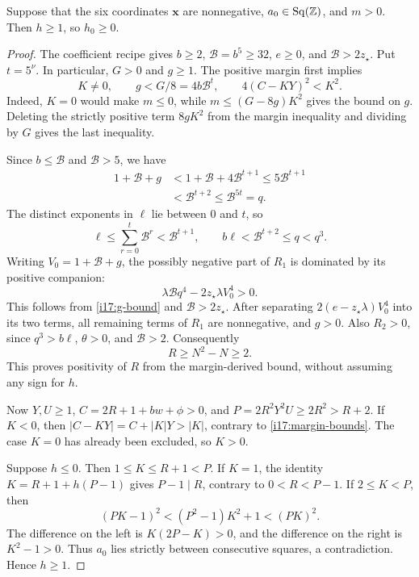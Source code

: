 \begin{lemma}
\label{i17:h-guard}
Suppose that the six coordinates $\mathbf x$ are nonnegative,
$a_0\in\operatorname{Sq}(\mathbb Z)$, and $m>0$. Then $h\ge1$, so $h_0\ge0$.
\end{lemma}
\begin{proof}
The coefficient recipe gives $b\ge2$, $\mathcal B=b^5\ge32$,
$e\ge0$, and $\mathcal B>2z_\star$. Put $t=5^\nu$.
In particular, $G>0$ and $g\ge1$. The positive margin first implies
\begin{equation}
 K\ne0,\qquad g<G/8=4b\mathcal B^t,\qquad
 4(C-KY)^2<K^2.
 \label{i17:margin-bounds}
\end{equation}
Indeed, $K=0$ would make $m\le0$, while
$m\le(G-8g)K^2$ gives the bound on $g$.
Deleting the strictly positive term $8gK^2$ from the margin inequality
and dividing by $G$ gives the last inequality.

Since $b\le\mathcal B$ and $\mathcal B>5$, we have
\begin{equation}
 \begin{aligned}
 1+\mathcal B+g
 &<1+\mathcal B+4\mathcal B^{t+1}
 \le5\mathcal B^{t+1}\\
 &<\mathcal B^{t+2}\le\mathcal B^{5t}=q.
 \end{aligned}
 \label{i17:g-bound}
\end{equation}
The distinct exponents in $\ell$ lie between $0$ and $t$, so
\[
 \ell\le\sum_{r=0}^t\mathcal B^r<\mathcal B^{t+1},
 \qquad b\ell<\mathcal B^{t+2}\le q<q^3.
\]
Writing $V_0=1+\mathcal B+g$, the possibly negative part of $R_1$ is
dominated by its positive companion:
\[
 \lambda\mathcal Bq^4-2z_\star\lambda V_0^4>0.
\]
This follows from \eqref{i17:g-bound} and $\mathcal B>2z_\star$.
After separating $2(e-z_\star\lambda)V_0^4$ into its two terms,
all remaining terms of $R_1$ are nonnegative, and $g>0$.
Also $R_2>0$, since $q^3>b\ell$, $\theta>0$, and $\mathcal B>2$.
Consequently
\[
 R\ge N^2-N\ge2.
\]
This proves positivity of $R$ from the margin-derived bound, without
assuming any sign for $h$.

Now $Y,U\ge1$, $C=2R+1+bw+\phi>0$, and
$P=2R^2Y^2U\ge2R^2>R+2$.
If $K<0$, then
$|C-KY|=C+|K|Y>|K|$, contrary to \eqref{i17:margin-bounds}.
The case $K=0$ has already been excluded, so $K>0$.

Suppose $h\le0$. Then $1\le K\le R+1<P$.
If $K=1$, the identity $K=R+1+h(P-1)$ gives $P-1\mid R$,
contrary to $0<R<P-1$.
If $2\le K<P$, then
\[
 (PK-1)^2<(P^2-1)K^2+1<(PK)^2.
\]
The difference on the left is $K(2P-K)>0$, and the difference on
the right is $K^2-1>0$. Thus $a_0$ lies strictly between consecutive
squares, a contradiction. Hence $h\ge1$.
\end{proof}

